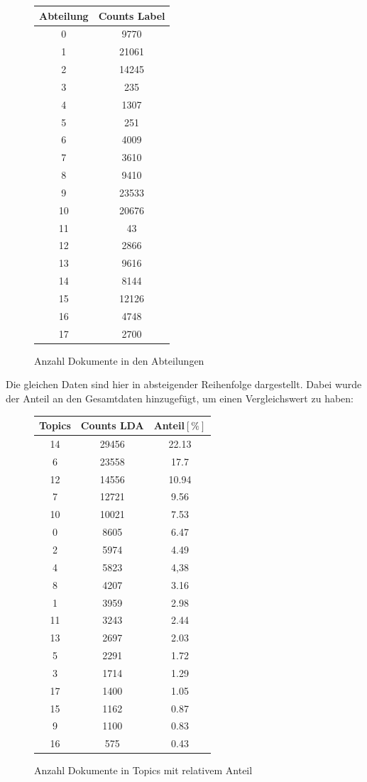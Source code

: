\documentclass[german,version-2020-11]{uzl-thesis}
\begin{document}
\begin{enumerate}

\begin{figure}[H]
\begin{center}
\begin{tabular}{cc}
\hline
\hline
Abteilung & Counts Label\\
\hline
0&9770\\
1&21061\\
2&14245\\
3&235\\
4&1307\\
5&251\\
6&4009\\
7&3610\\
8&9410\\
9&23533\\
10&20676\\
11&43\\
12&2866\\
13&9616\\
14&8144\\
15&12126\\
16&4748\\
17&2700\\
\hline
\hline
\end{tabular}
\caption{Anzahl Dokumente in den Abteilungen}
\end{center}
\end{figure}


Die gleichen Daten sind hier in absteigender Reihenfolge dargestellt. Dabei wurde der Anteil an den Gesamtdaten hinzugefügt, um einen Vergleichswert zu haben:


\begin{figure}[H]
\begin{center}
\begin{tabular}{ccc}
\hline 
\hline
Topics & Counts LDA & Anteil$[\%]$\\
\hline
14&29456&22.13\\
6&23558&17.7\\
12&14556&10.94\\
7&12721&9.56\\
10&10021&7.53\\
0&8605&6.47\\
2&5974&4.49\\
4&5823&4,38\\
8&4207&3.16\\
1&3959&2.98\\
11&3243&2.44\\
13&2697&2.03\\
5&2291&1.72\\
3&1714&1.29\\
17&1400&1.05\\
15&1162&0.87\\
9&1100&0.83\\
16&575&0.43\\
\hline
\hline
\end{tabular}
\caption{Anzahl Dokumente in Topics mit relativem Anteil}
\end{center}
\end{figure}


\end{enumerate}
\end{document}
